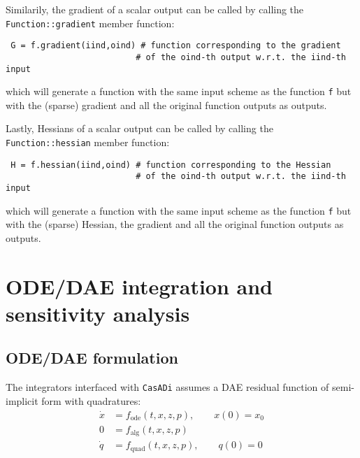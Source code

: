 \documentclass[a4paper,12pt]{book}
\newcommand{\CasADi}{\texttt{CasADi}\xspace}
\begin{document}
Similarily, the gradient of a scalar output can be called by calling the \texttt{Function::gradient} member function:
\begin{verbatim}
 G = f.gradient(iind,oind) # function corresponding to the gradient
                          # of the oind-th output w.r.t. the iind-th input
\end{verbatim}
which will generate a function with the same input scheme as the function \texttt{f} but with the (sparse) gradient and all the original function outputs as outputs.

Lastly, Hessians of a scalar output can be called by calling the \texttt{Function::hessian} member function:
\begin{verbatim}
 H = f.hessian(iind,oind) # function corresponding to the Hessian
                          # of the oind-th output w.r.t. the iind-th input
\end{verbatim}
which will generate a function with the same input scheme as the function \texttt{f} but with the (sparse) Hessian, the gradient and all the original function outputs as outputs.




\chapter{ODE/DAE integration and sensitivity analysis} \label{ch:integrators}
\section{ODE/DAE formulation}
The integrators interfaced with \CasADi assumes a DAE residual function of semi-implicit form with quadratures:
\begin{subequations}
\begin{align}
 \dot{x} &= f_{\text{ode}}(t,x,z,p), \qquad x(0) = x_0 \\
      0  &= f_{\text{alg}}(t,x,z,p) \\
 \dot{q} &= f_{\text{quad}}(t,x,z,p), \qquad q(0) = 0
\end{align}
\end{subequations}
\end{document}
